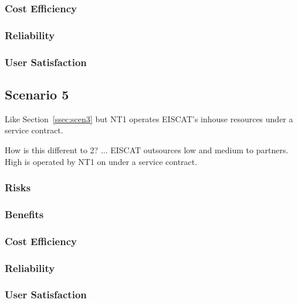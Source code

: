 \documentclass[12pt,a4paper]{article}
\begin{document}
\subsubsection*{Cost Efficiency}
\bitm
\item 
\eitm

\subsubsection*{Reliability}
\bitm
\item 
\eitm

\subsubsection*{User Satisfaction}
\bitm
\item 
\eitm
\subsection{Scenario 5}
\label{ssec:scen5}

Like Section~\ref{ssec:scen3} but NT1 operates EISCAT's inhouse resources under a service contract.

How is this different to 2? ... EISCAT outsources low and medium to partners. High is operated by NT1 on under a service contract.

\subsubsection*{Risks}
\bitm
\item 
\eitm

\subsubsection*{Benefits}
\bitm
\item 
\eitm

\subsubsection*{Cost Efficiency}
\bitm
\item 
\eitm

\subsubsection*{Reliability}
\bitm
\item 
\eitm

\subsubsection*{User Satisfaction}
\bitm
\item 
\eitm
\end{document}

